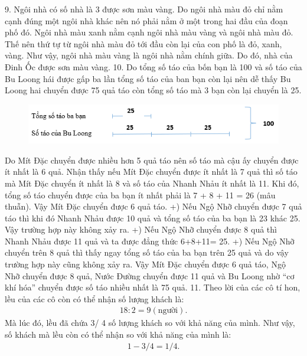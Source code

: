 \vskip 0.1cm
9. Ngôi nhà có số nhà là 3 được sơn màu vàng. Do ngôi nhà màu đỏ chỉ nằm cạnh đúng một ngôi nhà khác nên nó phải nằm ở một trong hai đầu của đoạn phố đó. Ngôi nhà màu xanh nằm cạnh ngôi nhà màu vàng và ngôi nhà màu đỏ. Thế nên thứ tự từ ngôi nhà màu đỏ tới đầu còn lại của con phố là đỏ, xanh, vàng. Như vậy, ngôi nhà màu vàng là ngôi nhà nằm chính giữa. Do đó, nhà của Đinh Ốc được sơn màu vàng.
\vskip 0.1cm
10. Do tổng số táo của bốn bạn là 100 và số táo của Bu Loong hái được gấp ba lần tổng số táo của ban bạn còn lại nên dễ thấy Bu Loong hai chuyển được 75 quả táo còn tổng số táo mà 3 bạn còn lại chuyển là 25. 
\begin{figure}[H]
	\centering
	\vspace*{-5pt}
	\captionsetup{labelformat= empty, justification=centering}
	\includegraphics[width=1\linewidth]{9}
	\vspace*{-15pt}
\end{figure}
Do Mít Đặc chuyển được nhiều hơn 5 quả táo nên số táo mà cậu ấy chuyển được ít nhất là 6 quả.
\vskip 0.1cm
Nhận thấy nếu Mít Đặc chuyển được ít nhất là 7 quả thì số táo mà Mít Đặc chuyển ít nhất là 8 và số táo của Nhanh Nhảu ít nhất là 11. Khi đó, tổng số táo chuyển được của ba bạn ít nhất phải là 7 + 8 + 11 = 26 (mâu thuẫn).
\vskip 0.1cm
Vậy Mít Đặc chuyển được 6 quả táo. 
\vskip 0.1cm
+) Nếu Ngộ Nhỡ chuyển được 7 quả táo thì khi đó Nhanh Nhảu được 10 quả và tổng số táo của ba bạn là 23 khác 25. Vậy trường hợp này không xảy ra.
\vskip 0.1cm
+) Nếu Ngộ Nhỡ chuyển được 8 quả thì Nhanh Nhảu được 11 quả và ta được đẳng thức 6+8+11= 25.
\vskip 0.1cm
+) Nếu Ngộ Nhỡ chuyển trên 8 quả thì thấy ngay tổng số táo của ba bạn trên 25 quả và do vậy trường hợp này cũng không xảy ra.
\vskip 0.1cm
Vậy Mít Đặc chuyển được 6 quả táo, Ngộ Nhỡ chuyển được 8 quả, Nước Đường chuyển được 11 quả và Bu Loong nhờ “cơ khí hóa” chuyển được số táo nhiều nhất là 75 quả.
\vskip 0.1cm
11. 
Theo lời của các cô tí hon, lều của các cô còn có thể nhận số lượng khách là:
\begin{align*}
	18 : 2 = 9 (\text{người}).
\end{align*}
Mà lúc đó, lều đã chứa 3/ 4 số lượng khách so với khả năng của mình.
Như vậy, số khách mà lều còn có thể nhận so với khả năng của mình là:
\begin{align*}
	1- 3 /4 = 1/ 4 .
\end{align*}
